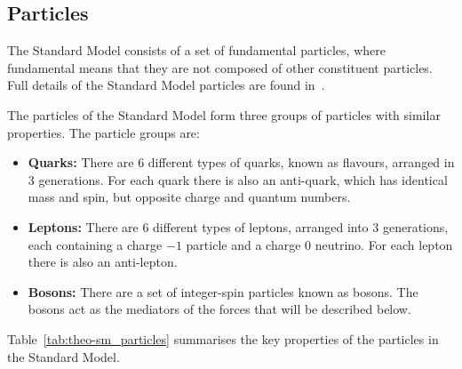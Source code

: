 \subsection{Particles}
\label{sec:theo-sm_particles}

The Standard Model consists of a set of fundamental particles,
where fundamental means that they are not composed of other constituent particles.
Full details of the Standard Model particles are found in~\cite{obj-bjets_PDG}.

\noindent
The particles of the Standard Model form three groups of particles with similar properties.
The particle groups are:

\begin{itemize}[leftmargin=*]
\item\textbf{Quarks:}
  There are 6 different types of quarks, known as flavours, arranged in 3 generations.
  For each quark there is also an anti-quark, which has identical mass and spin, but opposite charge and quantum numbers.  \vspace{1em}
  
\item\textbf{Leptons:}
  There are 6 different types of leptons,
  arranged into  3 generations, each containing a charge $-1$ particle and a charge 0 neutrino.
  For each lepton there is also an anti-lepton. \vspace{1em}
 
\item\textbf{Bosons:}
  There are a set of integer-spin particles  known as bosons.
  The bosons act as the mediators of the forces that will be described below.  \vspace{1em}
  
\end{itemize}
  
\noindent
Table~\ref{tab:theo-sm_particles} summarises the key properties of the particles in the Standard Model.

